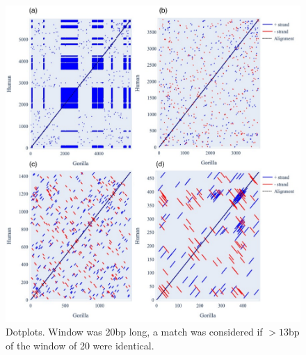 \begin{figure}[htbp]
\centering
\includegraphics[width=\textwidth]{figures/diagrams/primate_dotplots.pdf}
\caption{Dotplots. Window was 20bp long, a match was considered if $>13$bp of the window of 20 were identical. }
\label{fig:dotplots}
\end{figure}